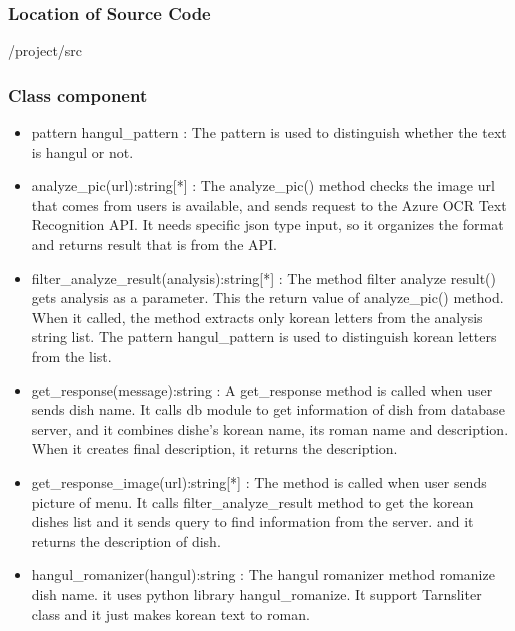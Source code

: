 \subsubsection {Location of Source Code}
/project/src \newline

\subsubsection {Class component}

\begin{itemize}

\item pattern hangul\_pattern : The pattern is used to distinguish whether the text is hangul or not. \newline
\item analyze\_pic(url):string[*] : The analyze\_pic() method checks the image url that comes from users is available, and sends request to the Azure OCR Text Recognition API. It needs specific json type input, so it organizes the format and returns result that is from the API. \newline
\item filter\_analyze\_result(analysis):string[*] : The method filter analyze result() gets analysis as a parameter. This the return value of analyze\_pic() method. When it called, the method extracts only korean letters from the analysis string list. The pattern hangul\_pattern is used to distinguish korean letters from the list. \newline
\item get\_response(message):string : A get\_response method is called when user sends dish name. It calls db module to get information of dish from database server, and it combines dishe's korean name, its roman name and description. When it creates final description, it returns the description. \newline
\item get\_response\_image(url):string[*] : The method is called when user sends picture of menu. It calls filter\_analyze\_result method to get the korean dishes list and it sends query to find information from the server. and it returns the description of dish. \newline
\item hangul\_romanizer(hangul):string : The hangul romanizer method romanize dish name. it uses python library hangul\_romanize. It support Tarnsliter class and it just makes korean text to roman. 
\end{itemize} 

